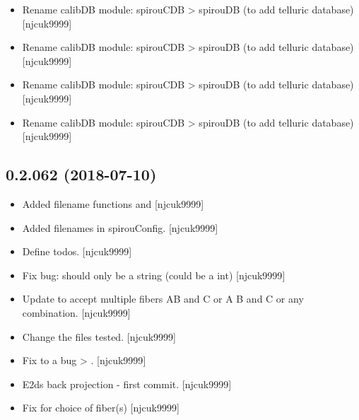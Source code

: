 \documentclass[a4paper,10pt,english]{report}
\begin{document}
\begin{itemize}
\item {} 
Rename calibDB module: spirouCDB \textendash{}\textgreater{} spirouDB (to add telluric
database) {[}njcuk9999{]}

\item {} 
Rename calibDB module: spirouCDB \textendash{}\textgreater{} spirouDB (to add telluric
database) {[}njcuk9999{]}

\item {} 
Rename calibDB module: spirouCDB \textendash{}\textgreater{} spirouDB (to add telluric
database) {[}njcuk9999{]}

\item {} 
Rename calibDB module: spirouCDB \textendash{}\textgreater{} spirouDB (to add telluric
database) {[}njcuk9999{]}

\end{itemize}


\subsection{0.2.062 (2018-07-10)}
\label{\detokenize{misc/changelog:id397}}\begin{itemize}
\item {} 
Added filename functions  and 
{[}njcuk9999{]}

\item {} 
Added filenames in spirouConfig. {[}njcuk9999{]}

\item {} 
Define todos. {[}njcuk9999{]}

\item {} 
Fix bug:  should only be a string (could be a int)
{[}njcuk9999{]}

\item {} 
Update to accept multiple fibers AB and C or A B and C or any
combination. {[}njcuk9999{]}

\item {} 
Change the files tested. {[}njcuk9999{]}

\item {} 
Fix to a bug  \textendash{}\textgreater{} . {[}njcuk9999{]}

\item {} 
E2ds back projection - first commit. {[}njcuk9999{]}

\item {} 
Fix for choice of fiber(s) {[}njcuk9999{]}

\end{itemize}
\end{document}
